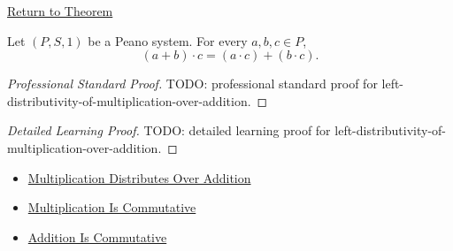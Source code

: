 \newpage
{}
\label{prf:left-distributivity-of-multiplication-over-addition}

\begin{remark*}[Return]
\hyperref[thm:left-distributivity-of-multiplication-over-addition]{Return to Theorem}
\end{remark*}

\begin{theorem*}
Let $(P,S,1)$ be a Peano system. For every $a,b,c \in P$,
\[
(a+b)\cdot c=(a\cdot c)+(b\cdot c).
\]
\end{theorem*}

\begin{proof}[Professional Standard Proof]
\LRAProofBodyStart
TODO: professional standard proof for left-distributivity-of-multiplication-over-addition.
\end{proof}

\begin{proof}[Detailed Learning Proof]
\LRAProofBodyStart
TODO: detailed learning proof for left-distributivity-of-multiplication-over-addition.
\end{proof}

\begin{remark*}
\end{remark*}

\begin{dependencies}
\begin{itemize}
  \item \hyperref[thm:multiplication-distributes-over-addition]{Multiplication Distributes Over Addition}
  \item \hyperref[thm:multiplication-commutative]{Multiplication Is Commutative}
  \item \hyperref[thm:addition-commutative]{Addition Is Commutative}
\end{itemize}
\end{dependencies}

\clearpage
